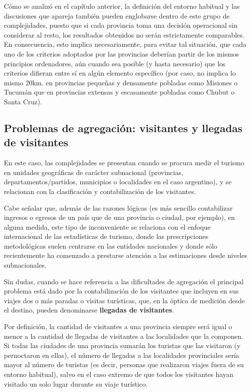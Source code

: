\documentclass[
  openany]{book}
\begin{document}
Cómo se analizó en el capítulo anterior, la definición del entorno habitual y las discusiones que apareja también pueden englobarse dentro de este grupo de complejidades, puesto que si cada provincia toma una decisión operacional sin considerar al resto, los resultados obtenidos no serán estrictamente comparables. En consecuencia, esto implica necesariamente, para evitar tal situación, que cada uno de los criterios adoptados por las provincias deberían partir de los mismos principios ordenadores, aún cuando sea posible (y hasta necesario) que los criterios difieran entre sí en algún elemento específico (por caso, no implica lo mismo 20km. en provincias pequeñas y densamente pobladas como Misiones o Tucumán que en provincias extensas y escasamente pobladas como Chubut o Santa Cruz).

\hypertarget{problemas-de-agregaciuxf3n-visitantes-y-llegadas-de-visitantes}{%
\subsection{Problemas de agregación: visitantes y llegadas de visitantes}\label{problemas-de-agregaciuxf3n-visitantes-y-llegadas-de-visitantes}}

En este caso, las complejidades se presentan cuando se procura medir el turismo en unidades geográficas de carácter subnacional (provincias, departamentos/partidos, municipios o localidades en el caso argentino), y se relacionan con la clasificación y contabilización de los visitantes.

Cabe señalar que, además de las razones lógicas (es más sencillo contabilizar ingresos o egresos de un país que de una provincia o ciudad, por ejemplo), en alguna medida, este tipo de inconveniente se relaciona con el enfoque internacional de las estadísticas de turismo, donde las prescripciones metodológicas suelen centrarse en las entidades nacionales y donde sólo recientemente ha comenzado a prestarse atención a las estimaciones desde niveles subnacionales.

Sin dudas, cuando se hace referencia a las dificultades de agregación el principal problema está dado por la contabilización de los visitantes que incluyen en sus viajes dos o más paradas o visitas turísticas, que, en la óptica de medición desde el destino, pueden denominarse \textbf{llegadas de visitantes}.

Por definición, la cantidad de visitantes a una provincia siempre será igual o menor a la cantidad de llegadas de visitantes a las localidades que la componen. Si todas las ciudades de una provincia sumarán los turistas que las visitaron (y pernoctaron en ellas), el número de llegadas a las localidades provinciales sería mayor al número de turistas (es decir, personas que realizaron viajes fuera de su entorno habitual), salvo en el caso extremo de que todos los visitantes hayan visitado un solo lugar durante su viaje turístico.
\end{document}
